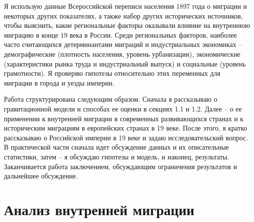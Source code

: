 \documentclass[a4paper,12pt]{article}
\let\oldsection\section
\renewcommand\section{\clearpage\oldsection}
\begin{document}
Я использую данные Всероссийской переписи населения 1897 года \citep{census_1897} о миграции и некоторых других показателях, а также набор других исторических источников, чтобы выяснить, какие региональные факторы оказывали влияние на внутреннюю миграцию в конце 19 века в России. Среди региональных факторов, наиболее часто считающихся детерминантами миграций и индустриальных экономиках -- демографические (плотность населения, уровень урбанизации), экономические (характеристики рынка труда и индустриальный выпуск) и социальные (уровень грамотности). Я проверяю гипотезы относительно этих переменных для миграции в города и уезды империи.

Работа структурирована следующим образом. Сначала я рассказываю о гравитационной модели и способах ее оценки в секциях 1.1 и 1.2. Далее -- о ее применении к внутренней миграции в современных развивающихся странах и к историческим миграциям в европейских странах в 19 веке. После этого, я кратко рассказываю о Российской империи в 19 веке и задаю исследовательский вопрос. В практической части сначала идет обсуждение данных и их описательные статистики, затем -- я обсуждаю гипотезы и модель, и наконец, результаты. Заканчивается работа заключением, обсуждающим ограничения результатов и дальнейшее обсуждение.

\section{Анализ внутренней миграции}
\end{document}
